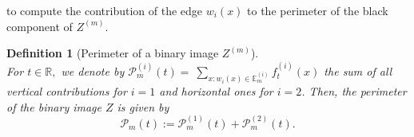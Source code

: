 \documentclass[12pt]{article}
\theoremstyle{Theorem}
\newtheorem{Definition}[Theorem]{Definition}
\begin{document}
to compute the contribution of the edge $w_i(x)$ to the perimeter of the black component of $Z^{\scriptscriptstyle (m)}$.
\begin{Definition}[Perimeter of a binary image $Z^{\scriptscriptstyle (m)}$]\label{defPerimetre}~\\
For $t\in \mathbb{R},$ we denote by $\mathcal{P}_{m}^{\scriptscriptstyle (i)}(t) =~\sum_{\scriptscriptstyle x: w_{i}(x) \in \mathbb{E}^{\scriptscriptstyle (i)}_{m}} f_{t}^{\scriptscriptstyle (i)}(x)$ the  sum of all vertical contributions for $i = 1$ and horizontal ones for $i = 2$. Then, the perimeter of the binary image $Z$ is given by
\begin{equation}
\mathcal{P}_{m}(t) := \mathcal{P}_{m}^{\scriptscriptstyle (1)}(t) + \mathcal{P}_{m}^{\scriptscriptstyle (2)}(t).
 \label{eq:6}
\end{equation}
\end{Definition}
\end{document}
